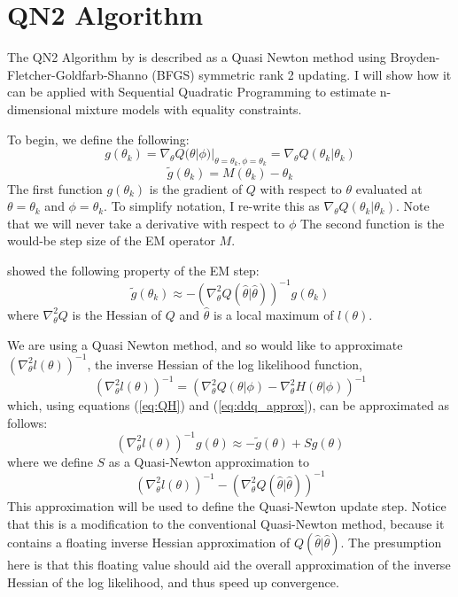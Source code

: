 \documentclass[letter,12pt]{article}
\begin{document}
\section{QN2 Algorithm}

The QN2 Algorithm by \cite{jamshidianj97} is described as a Quasi Newton method using Broyden-Fletcher-Goldfarb-Shanno (BFGS) symmetric rank 2 updating.  I will show how it can be applied with Sequential Quadratic Programming to estimate n-dimensional mixture models with equality constraints.   

To begin, we define the following:
\begin{equation} \label{eq:define_g}
g(\theta_k) = \nabla_{\theta}Q(\theta|\phi)|_{\theta =\theta_k, \phi = \theta_k}
= \nabla_{\theta}Q(\theta_k|\theta_k)
\end{equation}
\begin{equation} \label{eq:define_gsquiggly}
\tilde{g}(\theta_k) = M(\theta_k) - \theta_k
\end{equation}
The first function $g(\theta_k)$ is the gradient of $Q$ with respect to $\theta$ evaluated at $\theta = \theta_k$ and $\phi=\theta_k$.  To simplify notation, I re-write this as $\nabla_{\theta}Q(\theta_k|\theta_k)$.  Note that we will never take a derivative with respect to $\phi$ The second function is the would-be step size of the EM operator $M$.   

\cite{jamshidianj93} showed the following property of the EM step:
\begin{equation} \label{eq:ddq_approx}
\tilde{g}(\theta_k) \approx -(\nabla^2_{\theta}Q(\hat{\theta}|\hat{\theta}))^{-1}g(\theta_k)
\end{equation}
where $\nabla^2_{\theta}Q$ is the Hessian of $Q$ and $\hat{\theta}$ is a local maximum of $l(\theta)$.  

We are using a Quasi Newton method, and so would like to approximate  $(\nabla^2_{\theta}l(\theta))^{-1}$, the inverse Hessian of the log likelihood function, 
\[
(\nabla^2_{\theta}l(\theta))^{-1}
=
(\nabla^2_{\theta}Q(\theta|\phi)
-
\nabla^2_{\theta}H(\theta|\phi))^{-1}
\]
which, using equations (\ref{eq:QH}) and (\ref{eq:ddq_approx}), can be approximated as follows:
\[
(\nabla^2_{\theta}l(\theta))^{-1}g(\theta)
\approx
-\tilde{g}(\theta)
+
Sg(\theta)
\]
where we define $S$ as a Quasi-Newton approximation to
\[
(\nabla^2_{\theta}l(\theta))^{-1}-(\nabla^2_{\theta}Q(\hat{\theta}|\hat{\theta}))^{-1}
\]
This approximation will be used to define the Quasi-Newton update step.  Notice that this is a modification to the conventional Quasi-Newton method, because it contains a floating inverse Hessian approximation of $Q(\hat{\theta}|\hat{\theta})$.  The presumption here is that this floating value should aid the overall approximation of the inverse Hessian of the log likelihood, and thus speed up convergence.
\end{document}
